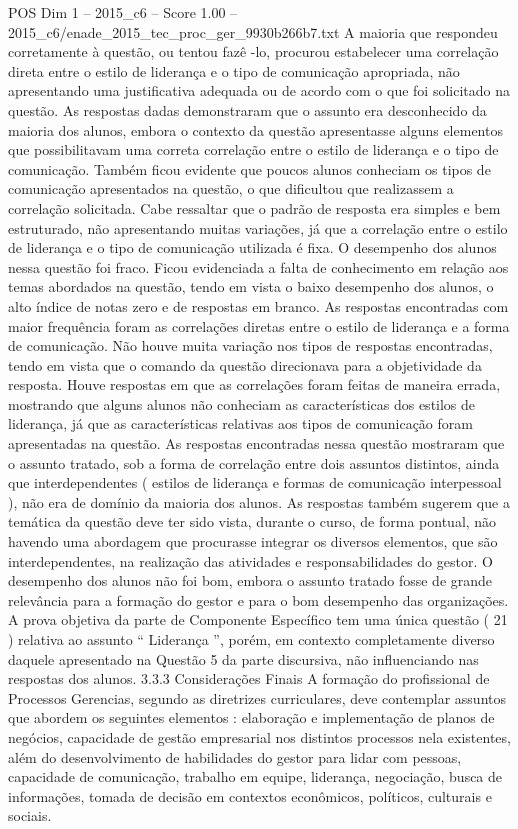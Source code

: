 \begin{textsample}{POS Dim 1 – 2015\_c6 – Score 1.00 – 2015\_c6/enade\_2015\_tec\_proc\_ger\_9930b266b7.txt}
A maioria que respondeu corretamente à questão, ou tentou fazê -lo, procurou estabelecer uma correlação direta entre o estilo de liderança e o tipo de comunicação apropriada, não apresentando uma justificativa adequada ou de acordo com o que foi solicitado na questão.
As respostas dadas demonstraram que o assunto era desconhecido da maioria dos alunos, embora o contexto da questão apresentasse alguns elementos que possibilitavam uma correta correlação entre o estilo de liderança e o tipo de comunicação.
Também ficou evidente que poucos alunos conheciam os tipos de comunicação apresentados na questão, o que dificultou que realizassem a correlação solicitada.
Cabe ressaltar que o padrão de resposta era simples e bem estruturado, não apresentando muitas variações, já que a correlação entre o estilo de liderança e o tipo de comunicação utilizada é fixa.
O desempenho dos alunos nessa questão foi fraco.
Ficou evidenciada a falta de conhecimento em relação aos temas abordados na questão, tendo em vista o baixo desempenho dos alunos, o alto índice de notas zero e de respostas em branco.
As respostas encontradas com maior frequência foram as correlações diretas entre o estilo de liderança e a forma de comunicação.
Não houve muita variação nos tipos de respostas encontradas, tendo em vista que o comando da questão direcionava para a objetividade da resposta.
Houve respostas em que as correlações foram feitas de maneira errada, mostrando que alguns alunos não conheciam as características dos estilos de liderança, já que as características relativas aos tipos de comunicação foram apresentadas na questão.
As respostas encontradas nessa questão mostraram que o assunto tratado, sob a forma de correlação entre dois assuntos distintos, ainda que interdependentes ( estilos de liderança e formas de comunicação interpessoal ), não era de domínio da maioria dos alunos.
As respostas também sugerem que a temática da questão deve ter sido vista, durante o curso, de forma pontual, não havendo uma abordagem que procurasse integrar os diversos elementos, que são interdependentes, na realização das atividades e responsabilidades do gestor.
O desempenho dos alunos não foi bom, embora o assunto tratado fosse de grande relevância para a formação do gestor e para o bom desempenho das organizações.
A prova objetiva da parte de Componente Específico tem uma única questão ( 21 ) relativa ao assunto “ Liderança ”, porém, em contexto completamente diverso daquele apresentado na Questão 5 da parte discursiva, não influenciando nas respostas dos alunos. 3.3.3 Considerações Finais A formação do profissional de Processos Gerencias, segundo as diretrizes curriculares, deve contemplar assuntos que abordem os seguintes elementos : elaboração e implementação de planos de negócios, capacidade de gestão empresarial nos distintos processos nela existentes, além do desenvolvimento de habilidades do gestor para lidar com pessoas, capacidade de comunicação, trabalho em equipe, liderança, negociação, busca de informações, tomada de decisão em contextos econômicos, políticos, culturais e sociais.

\end{textsample}
